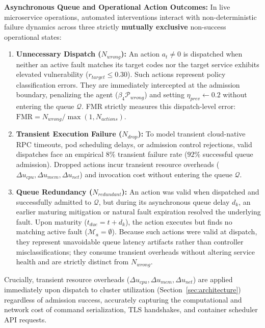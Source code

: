 \documentclass[ASNA,twocolumn]{USG}
\begin{document}
\textbf{Asynchronous Queue and Operational Action Outcomes:} In live microservice operations, automated interventions interact with non-deterministic failure dynamics across three strictly \textbf{mutually exclusive} non-success operational states:
\begin{enumerate}
    \item \textbf{Unnecessary Dispatch ($N_{wrong}$):} An action $a_t \ne 0$ is dispatched when neither an active fault matches its target codes nor the target service exhibits elevated vulnerability ($r_{target} \le 0.30$). Such actions represent policy classification errors. They are immediately intercepted at the admission boundary, penalizing the agent ($\beta_4 \mathcal{P}_{wrong}$) and setting $\eta_{prev} \leftarrow 0.2$ without entering the queue $\mathcal{Q}$. FMR strictly measures this dispatch-level error: $\text{FMR} = N_{wrong} / \max(1, N_{actions})$.
    \item \textbf{Transient Execution Failure ($N_{drop}$):} To model transient cloud-native RPC timeouts, pod scheduling delays, or admission control rejections, valid dispatches face an empirical $8\%$ transient failure rate ($92\%$ successful queue admission). Dropped actions incur transient resource overheads ($\Delta u_{cpu}, \Delta u_{mem}, \Delta u_{net}$) and invocation cost without entering the queue $\mathcal{Q}$.
    \item \textbf{Queue Redundancy ($N_{redundant}$):} An action was valid when dispatched and successfully admitted to $\mathcal{Q}$, but during its asynchronous queue delay $d_k$, an earlier maturing mitigation or natural fault expiration resolved the underlying fault. Upon maturity ($t_{due} = t + d_k$), the action executes but finds no matching active fault ($\mathcal{M}_a = \emptyset$). Because such actions were valid at dispatch, they represent unavoidable queue latency artifacts rather than controller misclassifications; they consume transient overheads without altering service health and are strictly distinct from $N_{wrong}$.
\end{enumerate}
Crucially, transient resource overheads ($\Delta u_{cpu}, \Delta u_{mem}, \Delta u_{net}$) are applied immediately upon dispatch to cluster utilization (Section~\ref{sec:architecture}) regardless of admission success, accurately capturing the computational and network cost of command serialization, TLS handshakes, and container scheduler API requests.
\end{document}
